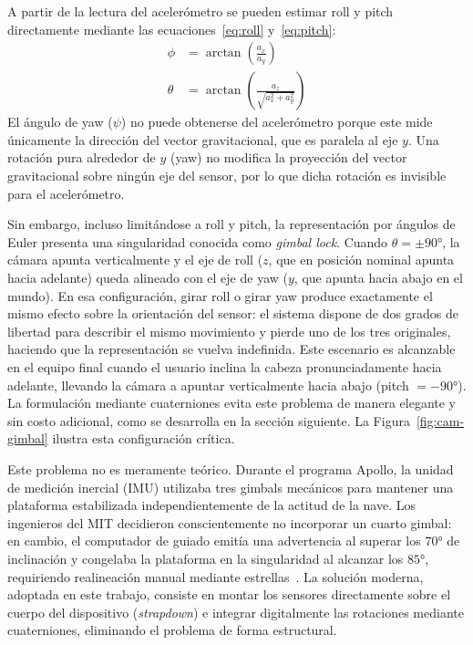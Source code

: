 A partir de la lectura del acelerómetro se pueden estimar roll y pitch
directamente mediante las ecuaciones~\ref{eq:roll} y~\ref{eq:pitch}:
\begin{align}
  \phi    &= \arctan\!\left(\frac{a_x}{a_y}\right) \label{eq:roll} \\
  \theta  &= \arctan\!\left(\frac{a_z}{\sqrt{a_x^2 + a_y^2}}\right) \label{eq:pitch}
\end{align}
El ángulo de yaw ($\psi$) no puede obtenerse del acelerómetro porque este
mide únicamente la dirección del vector gravitacional, que es paralela al eje
$y$. Una rotación pura alrededor de $y$ (yaw) no modifica la proyección del
vector gravitacional sobre ningún eje del sensor, por lo que dicha rotación
es invisible para el acelerómetro.

Sin embargo, incluso limitándose a roll y pitch, la representación por
ángulos de Euler presenta una singularidad conocida como \emph{gimbal lock}.
Cuando $\theta = \pm 90°$, la cámara apunta verticalmente y el eje de roll
($z$, que en posición nominal apunta hacia adelante) queda alineado con el
eje de yaw ($y$, que apunta hacia abajo en el mundo). En esa configuración,
girar roll o girar yaw produce exactamente el mismo efecto sobre la
orientación del sensor: el sistema dispone de dos grados de libertad para
describir el mismo movimiento y pierde uno de los tres originales, haciendo
que la representación se vuelva indefinida. Este escenario es alcanzable en
el equipo final cuando el usuario inclina la cabeza pronunciadamente hacia adelante,
llevando la cámara a apuntar verticalmente hacia abajo (pitch $= -90°$).
La formulación mediante cuaterniones evita este problema de manera elegante
y sin costo adicional, como se desarrolla en la sección siguiente.
La Figura~\ref{fig:cam-gimbal} ilustra esta configuración crítica.

Este problema no es meramente teórico. Durante el programa Apollo, la unidad
de medición inercial (IMU) utilizaba tres gimbals mecánicos para mantener
una plataforma estabilizada independientemente de la actitud de la nave.
Los ingenieros del MIT decidieron conscientemente no incorporar un cuarto
gimbal: en cambio, el computador de guiado emitía una advertencia al superar
los $70°$ de inclinación y congelaba la plataforma en la singularidad al
alcanzar los $85°$, requiriendo realineación manual mediante
estrellas~\cite{Hoag1963,Jones2006Gimbals}. La solución moderna, adoptada
en este trabajo, consiste en montar los sensores directamente sobre el cuerpo
del dispositivo (\emph{strapdown}) e integrar digitalmente las rotaciones
mediante cuaterniones, eliminando el problema de forma estructural.

